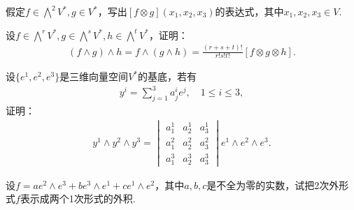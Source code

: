 \documentclass[../../main.tex]{subfiles}%
\begin{document}
\begin{example}
假定$f \in \bigwedge^2 V^*,g \in V^*$，写出$[f \otimes g](x_1,x_2,x_3)$的表达式，其中$x_1,x_2,x_3 \in V$.
\end{example}

\begin{example}
设$f \in \bigwedge^r V^*,g \in \bigwedge^s V^*,h \in \bigwedge^t V^*$，证明：
\begin{align*}
(f \wedge g) \wedge h = f \wedge (g \wedge h) = \frac{(r+s+t)!}{r!s!t!}[f \otimes g \otimes h].
\end{align*}
\end{example}

\begin{example}
设$\{e^1,e^2,e^3\}$是三维向量空间$V^*$的基底，若有
\begin{align*}
y^i = \sum\limits_{j=1}^{3} a_j^i e^j,\quad 1 \leqslant i \leqslant 3,
\end{align*}
证明：
\begin{align*}
y^1 \wedge y^2 \wedge y^3 =
\begin{vmatrix}
a_1^1 & a_2^1 & a_3^1 \\
a_1^2 & a_2^2 & a_3^2 \\
a_1^3 & a_2^3 & a_3^3
\end{vmatrix}
e^1 \wedge e^2 \wedge e^3.
\end{align*}
\end{example}

\begin{example}
设$f = a e^2 \wedge e^3 + b e^3 \wedge e^1 + c e^1 \wedge e^2$，其中$a,b,c$是不全为零的实数，试把2次外形式$f$表示成两个1次形式的外积.
\end{example}
\end{document}
